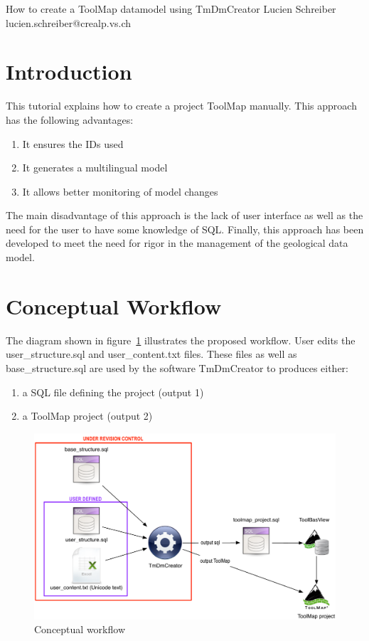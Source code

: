 \documentclass[a4paper, 12pt]{article}
\begin{document}
 {How to create a ToolMap datamodel using TmDmCreator} {Lucien Schreiber} {lucien.schreiber@crealp.vs.ch}
\tableofcontents
\pagebreak

\section{Introduction}
This tutorial explains how to create a project ToolMap manually. This approach has the following advantages:
\begin{enumerate}
  \item It ensures the IDs used
  \item It generates a multilingual model
  \item It allows better monitoring of model changes
\end{enumerate}
The main disadvantage of this approach is the lack of user interface as well as the need for the user to have some knowledge of SQL. Finally, this approach has been developed to meet the need for rigor in the management of the geological data model.


\section{Conceptual Workflow}
The diagram shown in figure~\ref{fig:conceptual-workflow} illustrates the proposed workflow. User edits the user\_structure.sql and user\_content.txt files. These files as well as base\_structure.sql are used by the software TmDmCreator to produces either:
\begin{enumerate}
  \item	a SQL file defining the project (output 1)
  \item	a ToolMap project (output 2)
\end{enumerate}

\begin{figure} [htbp]
	\centering
    \includegraphics[width=1\textwidth]{img/workflow.pdf}
    \caption{Conceptual workflow}
    \label{fig:conceptual-workflow}
\end{figure}
\end{document}
